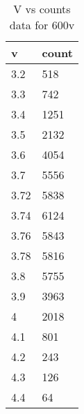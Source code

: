 \begin{table}[H]
    \centering
    \begin{tabular}{|l|l|}
    \hline
        v & count \\ \hline
        3.2 & 518 \\ \hline
        3.3 & 742 \\ \hline
        3.4 & 1251 \\ \hline
        3.5 & 2132 \\ \hline
        3.6 & 4054 \\ \hline
        3.7 & 5556 \\ \hline
        3.72 & 5838 \\ \hline
        3.74 & 6124 \\ \hline
        3.76 & 5843 \\ \hline
        3.78 & 5816 \\ \hline
        3.8 & 5755 \\ \hline
        3.9 & 3963 \\ \hline
        4 & 2018 \\ \hline
        4.1 & 801 \\ \hline
        4.2 & 243 \\ \hline
        4.3 & 126 \\ \hline
        4.4 & 64 \\ \hline
    \end{tabular}
    \caption{V vs counts data for 600v}
    \label{tab:600}
\end{table}